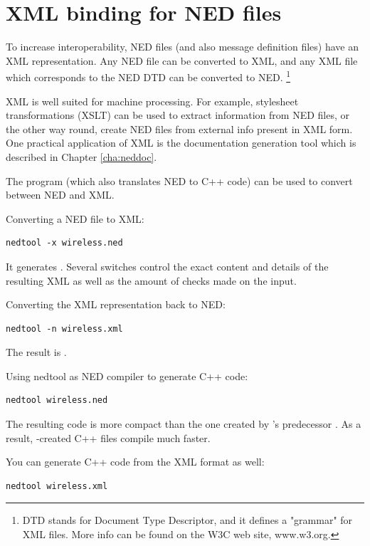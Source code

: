 \section{XML binding for NED files}

To increase interoperability, NED files (and also message definition files)
have an XML representation. Any NED file can be converted to XML, and
any XML file which corresponds to the NED DTD can be converted to NED.
  \footnote{DTD stands for Document Type Descriptor, and it defines
  a "grammar" for XML files. More info can be found on the W3C web site,
  www.w3.org.}

XML is well suited for machine processing. For example, stylesheet
transformations (XSLT) can be used to extract information from NED files,
or the other way round, create NED files from external info present in
XML form. One practical application of XML is the 
documentation generation tool which is described in Chapter \ref{cha:neddoc}.

The  program (which also translates NED to C++ code)
can be used to convert between NED and XML.

Converting a NED file to XML:

\begin{verbatim}
nedtool -x wireless.ned
\end{verbatim}

It generates .
Several switches control the exact content and details
of the resulting XML as well as the amount of checks
made on the input.

Converting the XML representation back to NED:

\begin{verbatim}
nedtool -n wireless.xml
\end{verbatim}

The result is .

Using nedtool as NED compiler to generate C++ code:

\begin{verbatim}
nedtool wireless.ned
\end{verbatim}

The resulting code is more compact than the
one created by 's predecessor .
As a result, -created 
C++ files compile much faster.

You can generate C++ code from the XML format as well:

\begin{verbatim}
nedtool wireless.xml
\end{verbatim}




